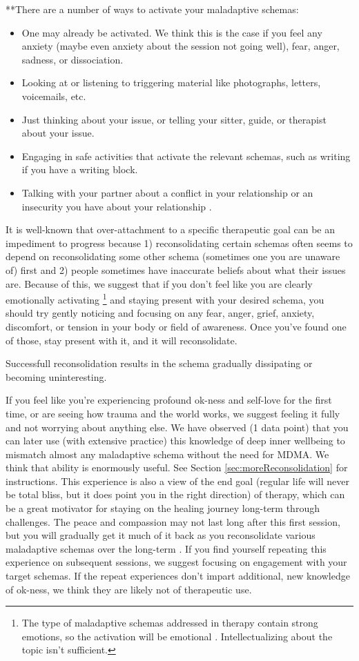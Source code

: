 \documentclass[12pt,letterpaper]{book}
\begin{document}
**There are a number of ways to activate your maladaptive schemas:
\begin{itemize}
    \item One may already be activated. We think this is the case if you feel any anxiety (maybe even anxiety about the session not going well), fear, anger, sadness, or dissociation.
    \item Looking at or listening to triggering material like photographs, letters, voicemails, etc.
    \item Just thinking about your issue, or telling your sitter, guide, or therapist about your issue.
    \item Engaging in safe activities that activate the relevant schemas, such as writing if you have a writing block.
    \item Talking with your partner about a conflict in your relationship or an insecurity you have about your relationship \cite{colbertEvenings}.
\end{itemize}
It is well-known that over-attachment to a specific therapeutic goal can be an impediment to progress because 1) reconsolidating certain schemas often seems to depend on reconsolidating some other schema (sometimes one you are unaware of) first and 2) people sometimes have inaccurate beliefs about what their issues are. Because of this, we suggest that if you don't feel like you are clearly emotionally activating \footnote{The type of maladaptive schemas addressed in therapy contain strong emotions, so the activation will be emotional \cite{eckerUnlocking}. Intellectualizing about the topic isn't sufficient.} and staying present with your desired schema, you should try gently noticing and focusing on any fear, anger, grief, anxiety, discomfort, or tension in your body or field of awareness. Once you've found one of those, stay present with it, and it will reconsolidate.

Successfull reconsolidation results in the schema gradually dissipating or becoming uninteresting. 

If you feel like you're experiencing profound ok-ness and self-love for the first time, or are seeing how trauma and the world works, we suggest feeling it fully and not worrying about anything else. We have observed (1 data point) that you can later use (with extensive practice) this knowledge of deep inner wellbeing to mismatch almost any maladaptive schema without the need for MDMA. We think that ability is enormously useful. See Section \ref{sec:moreReconsolidation} for instructions. This experience is also a view of the end goal (regular life will never be total bliss, but it does point you in the right direction) of therapy, which can be a great motivator for staying on the healing journey long-term through challenges. The peace and compassion may not last long after this first session, but you will gradually get it much of it back as you reconsolidate various maladaptive schemas over the long-term \cite{evansAfterglow}. If you find yourself repeating this experience on subsequent sessions, we suggest focusing on engagement with your target schemas. If the repeat experiences don't impart additional, new knowledge of ok-ness, we think they are likely not of therapeutic use.
\end{document}
